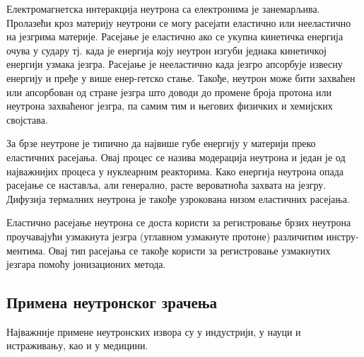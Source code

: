 \documentclass[12pt,a4paper,serbian,oneside]{book}
\begin{document}
Електромагнетска интеракција неутрона са електронима је занемарљива. Пролазећи кроз материју неутрони се могу расејати еластично или нееластично на језгрима материје. Расејање је еластично ако се укупна кинетичка енергија очува у судару тј. када је енергија коју неутрон изгуби једнака кинетичкој енергији узмака језгра. Расејање је нееластично када језгро апсорбује извесну енергију и пређе у више енер-гетско стање. Такође, неутрон може бити захваћен или апсорбован од стране језгра што доводи до промене броја протона или неутрона захваћеног језгра, па самим тим и његових физичких и хемијских својстава.

За брзе неутроне је типично да највише губе енергију у материји преко еластичних расејања. Овај процес се назива модерација неутрона и један је од најважнијих процеса у нуклеарним реакторима. Како енергија неутрона опада расејање се наставља, али генерално, расте вероватноћа захвата на језгру. Дифузија термалних неутрона је такође узрокована низом еластичних расејања.

Еластично расејање неутрона се доста користи за регистровање брзих неутрона проучавајући узмакнута језгра (углавном узмакнуте протоне) различитим инстру-ментима. Овај тип расејања се такође користи за регистровање узмакнутих језгара помоћу јонизационих метода.

\subsection{Примена неутронског зрачења}

Најважније примене неутронских извора су у индустрији, у науци и истраживању, као и у медицини. 
\end{document}
